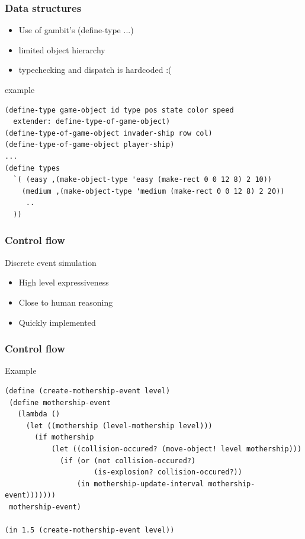 \documentclass{beamer}
\newcommand{\<}[1]{\`#1}
\begin{document}
\begin{frame}[fragile]
  \frametitle{Data structures}

  \begin{block}{}
  \begin{itemize}
    \item Use of gambit's (define-type ...)
    \item limited object hierarchy
    \item typechecking and dispatch is \alert{hardcoded} :(
  \end{itemize}
  \end{block}

  \begin{block}{example}
    \begin{lstlisting}[basicstyle=\footnotesize]
(define-type game-object id type pos state color speed 
  extender: define-type-of-game-object)
(define-type-of-game-object invader-ship row col)
(define-type-of-game-object player-ship)
...
(define types
  `( (easy ,(make-object-type 'easy (make-rect 0 0 12 8) 2 10))
    (medium ,(make-object-type 'medium (make-rect 0 0 12 8) 2 20))
     ..
  ))
    \end{lstlisting}
  \end{block}

\end{frame}



\begin{frame}
  \frametitle{Control flow}
  \begin{block}{Discrete event simulation}
    \begin{itemize}
    \item High level expressiveness
    \item Close to human reasoning
    \item Quickly implemented
    \end{itemize}
  \end{block}
\end{frame}

\begin{frame}[fragile]
  \frametitle{Control flow}
  \begin{block}{Example}
    \begin{lstlisting}[basicstyle=\footnotesize]
(define (create-mothership-event level)
 (define mothership-event
   (lambda ()
     (let ((mothership (level-mothership level)))
       (if mothership
           (let ((collision-occured? (move-object! level mothership)))
             (if (or (not collision-occured?)
                     (is-explosion? collision-occured?))
                 (in mothership-update-interval mothership-event)))))))
 mothership-event)

(in 1.5 (create-mothership-event level))
    \end{lstlisting}
  \end{block}
\end{frame}
\end{document}
